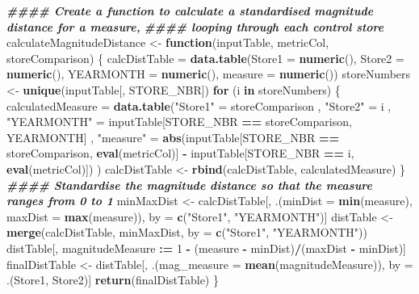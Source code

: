 \documentclass[
]{article}
\newenvironment{Shaded}{\begin{snugshade}}{\end{snugshade}}
\newcommand{\AttributeTok}[1]{\textcolor[rgb]{0.13,0.29,0.53}{#1}}
\newcommand{\ControlFlowTok}[1]{\textcolor[rgb]{0.13,0.29,0.53}{\textbf{#1}}}
\newcommand{\DecValTok}[1]{\textcolor[rgb]{0.00,0.00,0.81}{#1}}
\newcommand{\DocumentationTok}[1]{\textcolor[rgb]{0.56,0.35,0.01}{\textbf{\textit{#1}}}}
\newcommand{\FunctionTok}[1]{\textcolor[rgb]{0.13,0.29,0.53}{\textbf{#1}}}
\newcommand{\NormalTok}[1]{#1}
\newcommand{\OtherTok}[1]{\textcolor[rgb]{0.56,0.35,0.01}{#1}}
\newcommand{\SpecialCharTok}[1]{\textcolor[rgb]{0.81,0.36,0.00}{\textbf{#1}}}
\newcommand{\StringTok}[1]{\textcolor[rgb]{0.31,0.60,0.02}{#1}}
\begin{document}
\begin{Shaded}
\begin{Highlighting}[]
\DocumentationTok{\#\#\#\# Create a function to calculate a standardised magnitude distance for a measure,}
\DocumentationTok{\#\#\#\# looping through each control store}
\NormalTok{calculateMagnitudeDistance }\OtherTok{\textless{}{-}} \ControlFlowTok{function}\NormalTok{(inputTable, metricCol, storeComparison) \{}
\NormalTok{calcDistTable }\OtherTok{=} \FunctionTok{data.table}\NormalTok{(}\AttributeTok{Store1 =} \FunctionTok{numeric}\NormalTok{(), }\AttributeTok{Store2 =} \FunctionTok{numeric}\NormalTok{(), }\AttributeTok{YEARMONTH =}
\FunctionTok{numeric}\NormalTok{(), }\AttributeTok{measure =} \FunctionTok{numeric}\NormalTok{())}
\NormalTok{  storeNumbers }\OtherTok{\textless{}{-}} \FunctionTok{unique}\NormalTok{(inputTable[, STORE\_NBR])}
  \ControlFlowTok{for}\NormalTok{ (i }\ControlFlowTok{in}\NormalTok{ storeNumbers) \{}
\NormalTok{  calculatedMeasure }\OtherTok{=} \FunctionTok{data.table}\NormalTok{(}\StringTok{"Store1"} \OtherTok{=}\NormalTok{ storeComparison}
\NormalTok{                                 , }\StringTok{"Store2"} \OtherTok{=}\NormalTok{ i}
\NormalTok{                                 , }\StringTok{"YEARMONTH"} \OtherTok{=}\NormalTok{ inputTable[STORE\_NBR }\SpecialCharTok{==}
\NormalTok{storeComparison, YEARMONTH]}
\NormalTok{                                 , }\StringTok{"measure"} \OtherTok{=} \FunctionTok{abs}\NormalTok{(inputTable[STORE\_NBR }\SpecialCharTok{==}
\NormalTok{storeComparison, }\FunctionTok{eval}\NormalTok{(metricCol)]}
                                                   \SpecialCharTok{{-}}\NormalTok{ inputTable[STORE\_NBR }\SpecialCharTok{==}\NormalTok{ i,}
\FunctionTok{eval}\NormalTok{(metricCol)])}
\NormalTok{                                  )}
\NormalTok{    calcDistTable }\OtherTok{\textless{}{-}} \FunctionTok{rbind}\NormalTok{(calcDistTable, calculatedMeasure)}
\NormalTok{\}}
\DocumentationTok{\#\#\#\# Standardise the magnitude distance so that the measure ranges from 0 to 1}
\NormalTok{  minMaxDist }\OtherTok{\textless{}{-}}\NormalTok{ calcDistTable[, .(}\AttributeTok{minDist =} \FunctionTok{min}\NormalTok{(measure), }\AttributeTok{maxDist =} \FunctionTok{max}\NormalTok{(measure)),}
\NormalTok{by }\OtherTok{=} \FunctionTok{c}\NormalTok{(}\StringTok{"Store1"}\NormalTok{, }\StringTok{"YEARMONTH"}\NormalTok{)]}
\NormalTok{  distTable }\OtherTok{\textless{}{-}} \FunctionTok{merge}\NormalTok{(calcDistTable, minMaxDist, }\AttributeTok{by =} \FunctionTok{c}\NormalTok{(}\StringTok{"Store1"}\NormalTok{, }\StringTok{"YEARMONTH"}\NormalTok{))}
\NormalTok{  distTable[, magnitudeMeasure }\SpecialCharTok{:=} \DecValTok{1} \SpecialCharTok{{-}}\NormalTok{ (measure }\SpecialCharTok{{-}}\NormalTok{ minDist)}\SpecialCharTok{/}\NormalTok{(maxDist }\SpecialCharTok{{-}}\NormalTok{ minDist)]}
\NormalTok{  finalDistTable }\OtherTok{\textless{}{-}}\NormalTok{ distTable[, .(}\AttributeTok{mag\_measure =} \FunctionTok{mean}\NormalTok{(magnitudeMeasure)), by }\OtherTok{=}
\NormalTok{.(Store1, Store2)]}
  \FunctionTok{return}\NormalTok{(finalDistTable)}
\NormalTok{\}}
\end{Highlighting}
\end{Shaded}
\end{document}
